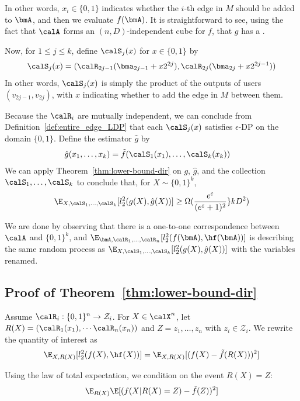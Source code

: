 In other words, 
$x_i \in \{0,1\}$ indicates whether the $i$-th edge in $M$ should be
added to $\bmA$, and then we evaluate $f(\bmA)$. It is straightforward to see,
using the fact that $\calA$ forms an $(n,D)$-independent cube for $f$, that $g$
has a 
.

Now, for $1 \leq j \leq k$, define $\calS_j(x)$ for $x \in \{0,1\}$ by
\[
  \calS_j(x) = (\calR_{2j-1}(\bma_{2j-1} + x2^{2j}),
  \calR_{2j}(\bma_{2j} + x2^{2j-1}))
\]
In other words, $\calS_j(x)$ is simply the product of the outputs of users
$(v_{2j-1}, v_{2j})$, with $x$ indicating whether to add the edge in $M$ between them.

Because the $\calR_i$ are mutually independent, we can conclude from
Definition~\ref{def:entire_edge_LDP} that each $\calS_j(x)$ satisfies $\epsilon$-DP
on the domain $\{0,1\}$. Define the estimator $\hat{g}$ by
\begin{align*}
  \hat{g}(x_1, \ldots, x_k) &= \tilde{f}(\calS_1(x_1), \ldots,
  \calS_{k}(x_k))
\end{align*}
We can apply Theorem~\ref{thm:lower-bound-dir} on $g$, $\hat{g}$, and
the collection $\calS_1,\ldots, \calS_k$ to conclude that, for $X \sim
\{0,1\}^k$,
\[
  \E_{X,\calS_1, \ldots, \calS_k}[l_2^2(g(X), \hat{g}(X) )] \geq \Omega(
  \frac{e^{\varepsilon}}{(e^{\varepsilon}+1)^2}\}kD^2)
\]

We are done by observing that there is a one-to-one correspondence between
$\calA$ and $\{0,1\}^k$, and $\E_{\bmA, \calR_1, \ldots,
\calR_n}[l_2^2(f(\bmA), \hf(\bmA))]$ is describing the same random process as
$\E_{X, \calS_1, \ldots, \calS_k}[l_2^2(g(X), \hat{g}(X) )]$ with the variables
renamed.

\subsection{Proof of
Theorem~\ref{thm:lower-bound-dir}}\label{sub:proof_thm_lower-bound-dir}

Assume $\calR_i : \{0,1\}^n \rightarrow \mathcal{Z}_i$.
For $X \in \calX^n$, let $R(X) = (\calR_1(x_1), \cdots \calR_n(x_n))$ and
$Z = z_1, \ldots, z_n$ with $z_i \in \mathcal{Z}_i$. 
We rewrite the quantity of interest as
\[
  \E_{X, R(X)}[l_2^2(f(X), \hf(X))] = \E_{X, R(X)}[(f(X)- \tilde{f}(R(X)))^2]
\]

Using the law of total expectation, we condition on the event $R(X) = Z$:
\begin{align*}
  \E_{R(X)} \E[(f(X|R(X)=Z) - \tilde{f}(Z) )^2]
\end{align*}

